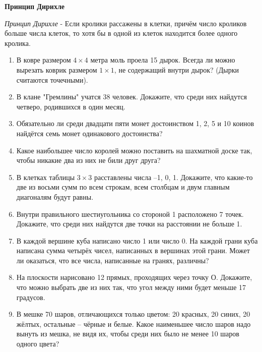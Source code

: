 \documentclass{article}
\begin{document}
\large
	
\begin{center}
	\textbf{Принцип Дирихле}
\end{center}


\textit{Принцип Дирихле} - Если кролики рассажены в клетки, причём число кроликов больше числа клеток, то хотя бы в одной из клеток находится более одного кролика.

\begin{enumerate}[label*=\protect\fbox{\arabic{enumi}}]
	
	\item В ковре размером $4 \times 4$ метра моль проела 15 дырок. Всегда ли можно вырезать коврик размером $1 \times 1$, не содержащий внутри дырок? (Дырки считаются точечными).
	
	\item В клане "Гремлины" учатся 38 человек. Докажите, что среди них найдутся четверо, родившихся в один месяц.
	
	\item Обязательно ли среди двадцати пяти монет достоинством 1, 2, 5 и 10 коинов найдётся семь монет одинакового достоинства?
	
	\item Какое наибольшее число королей можно поставить на шахматной доске так, чтобы никакие два из них не били друг друга?
	
	\item В клетках таблицы $3 \times 3$ расставлены числа –1, 0, 1. Докажите, что какие-то две из восьми сумм по всем строкам, всем столбцам и двум главным диагоналям будут равны.
	
	\item Внутри правильного шестиугольника со стороной 1 расположено 7 точек. Докажите, что среди них найдутся две точки на расстоянии не больше 1.
	
	\item В каждой вершине куба написано число 1 или число 0. На каждой грани куба написана сумма четырёх чисел, написанных в вершинах этой грани. Может ли оказаться, что все числа, написанные на гранях, различны? 
	
	\item На плоскости нарисовано 12 прямых, проходящих через точку О. Докажите, что можно выбрать две из них так, что угол между ними будет меньше 17 градусов.
	
	\item В мешке 70 шаров, отличающихся только цветом: 20 красных, 20 синих, 20 жёлтых, остальные – чёрные и белые. 
	Какое наименьшее число шаров надо вынуть из мешка, не видя их, чтобы среди них было не менее 10 шаров одного цвета?
	

\end{enumerate}
\end{document}
